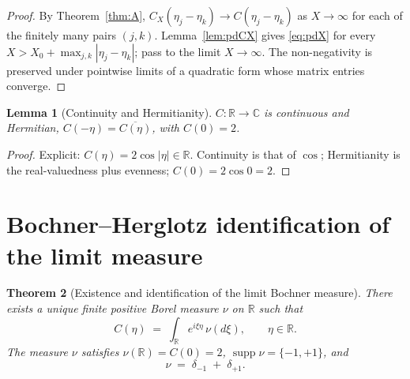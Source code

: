 \documentclass[11pt]{article}
\newtheorem{theorem}{Theorem}
\newtheorem{lemma}[theorem]{Lemma}
\theoremstyle{definition}
\theoremstyle{remark}
\DeclareMathOperator{\supp}{supp}
\begin{document}
\begin{proof}
By Theorem~\ref{thm:A}, $C_X(\eta_j-\eta_k)\to C(\eta_j-\eta_k)$ as $X\to\infty$ for each of the finitely many pairs $(j,k)$. Lemma~\ref{lem:pdCX} gives \eqref{eq:pdX} for every $X>X_0+\max_{j,k}|\eta_j-\eta_k|$; pass to the limit $X\to\infty$. The non-negativity is preserved under pointwise limits of a quadratic form whose matrix entries converge.
\end{proof}

\begin{lemma}[Continuity and Hermitianity]\label{lem:contH}
$C:\mathbb{R}\to\mathbb{C}$ is continuous and Hermitian, $C(-\eta)=\overline{C(\eta)}$, with $C(0)=2$.
\end{lemma}

\begin{proof}
Explicit: $C(\eta)=2\cos|\eta|\in\mathbb{R}$. Continuity is that of $\cos$; Hermitianity is the real-valuedness plus evenness; $C(0)=2\cos 0=2$.
\end{proof}

\section{Bochner--Herglotz identification of the limit measure}

\begin{theorem}[Existence and identification of the limit Bochner measure]\label{thm:bochner}
There exists a unique finite positive Borel measure $\nu$ on $\mathbb{R}$ such that
\begin{equation}\label{eq:bochner}
  C(\eta)\;=\;\int_{\mathbb{R}}e^{i\xi\eta}\,\nu(d\xi),\qquad\eta\in\mathbb{R}.
\end{equation}
The measure $\nu$ satisfies $\nu(\mathbb{R})=C(0)=2$, $\supp\nu=\{-1,+1\}$, and
\begin{equation}\label{eq:atoms}
  \nu\;=\;\delta_{-1}\;+\;\delta_{+1}.
\end{equation}
\end{theorem}
\end{document}

